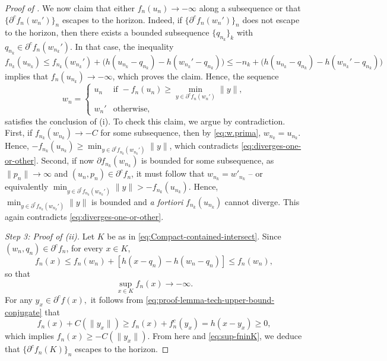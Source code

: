 \documentclass[11pt]{article}
\theoremstyle{plain}
\theoremstyle{definition}\newtheorem{definition}[theorem]{Definition}
\theoremstyle{remark}
\begin{document}
\begin{proof}[Proof of ]
We now claim that either $f_n(u_n)\to -\infty$ along a subsequence or that  
$\{\partial^c f_n(w_n')\}_n$ escapes to the horizon. Indeed, if 
$\{\partial^c f_n(w_n')\}_n$ does not escape to the horizon, then there exists a bounded 
subsequence $\{q_{n_k}\}_k$ with $q_{n_k}\in \partial^c f_n(w_{n_k}')$. In that case, 
the inequality
\begin{equation}
    \label{eq:diverges-one-or-other}
    f_{n_k}(u_{n_k})\leq f_{n_k}(w_{n_k}')+\bigl(h(u_{n_k}-q_{n_k})-h(w_{n_k}'-q_{n_k})\bigr) \leq -n_k+\bigl(h(u_{n_k}-q_{n_k})-h(w_{n_k}'-q_{n_k})\bigr)
\end{equation}
implies that $f_n(u_{n_k})\to -\infty$, which proves the claim. Hence, the sequence 
$$ w_n = \begin{cases}
   u_n  & \text{if }     -f_n(u_n) \geq \min_{y\in \partial^c f_n(w_{n}')} \|y\| ,\\
   w_n'   & \text{otherwise},    
\end{cases}   $$
satisfies the conclusion of (i). 
%
%
%
%
%
%
%
%
%
%
%
%
%
%
%
%
To check this claim, we argue by contradiction. First, if $f_{n_k}(w_{n_k})\to -C$ for some subsequence, then by \eqref{eq:w.prima}, $w_{n_k}=u_{n_k}$. Hence, $-f_{n_k}(u_{n_k}) \geq \min_{y\in \partial^c f_{n_k}(w_{n_k}')} \|y\|$, which contradicts \eqref{eq:diverges-one-or-other}. Second, if now $\partial f_{n_k}(w_{n_k})$ is bounded for some subsequence, as $ \|p_n\|\to \infty$ and $(u_n,p_n)\in\partial^c f_n  $, it must follow that $w_{n_k}=w'_{n_k}$ -- or equivalently $\min_{y\in \partial^c f_{n_k}(w_{n_k}')} \|y\| > -f_{n_k}(u_{n_k}) $. Hence,   $\min_{y\in \partial^c f_{n_k}(w_{n_k}')} \|y\| $ is bounded and {\it a fortiori} $f_{n_k}(u_{n_k})$ cannot diverge. This again contradicts \eqref{eq:diverges-one-or-other}. 

{\it Step 3: Proof of (ii).}  Let $K$ be as in \eqref{eq:Compact-contained-intersect}. Since $(w_n,q_n)\in \partial^c f_n$, for every $x\in K$,
   $$f_n(x)\leq f_n(w_n)+[h(x-q_n)-h(w_n-q_n)] \leq f_n(w_n), $$  
so that
\begin{equation}
    \label{eq:sup-fninK}
    \sup_{x\in K} f_n(x) \to -\infty. 
\end{equation}
 For any $y_x\in \partial^c f(x),$ it follows from \eqref{eq:proof-lemma-tech-upper-bound-conjugate} that 
$$ f_n(x)+ C( \|y_x\|)\geq   f_n(x)+ f_n^c(y_x) = h(x-y_x) \geq 0,$$
which implies 
$ f_n(x) \geq - C( \|y_x\|) $.  From here and \eqref{eq:sup-fninK}, we deduce that $\{\partial^c f_{n}(K)\}_n$ escapes to the horizon. 


\end{proof}
\end{document}
